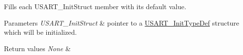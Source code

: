 Fills each U\+S\+A\+R\+T\+\_\+\+Init\+Struct member with its default value. 


\begin{DoxyParams}{Parameters}
{\em U\+S\+A\+R\+T\+\_\+\+Init\+Struct} & pointer to a \hyperlink{struct_u_s_a_r_t___init_type_def}{U\+S\+A\+R\+T\+\_\+\+Init\+Type\+Def} structure which will be initialized. \\
\hline
\end{DoxyParams}

\begin{DoxyRetVals}{Return values}
{\em None} & \\
\hline
\end{DoxyRetVals}
